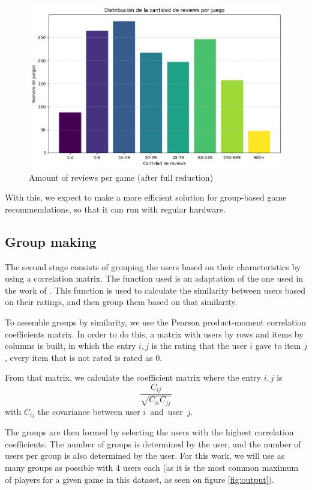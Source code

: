 \documentclass{article}
\begin{document}
\begin{figure}[h]
    \centering
    \includegraphics[width=0.9\linewidth]{ReviewsPorJuegoFinal.png}
    \caption{Amount of reviews per game (after full reduction)}
    \label{fig:reviewsPorJuegoFinal}
\end{figure}

With this, we expect to make a more efficient solution for group-based game recommendations, so that it can run with regular hardware.

\subsection{Group making}

The second stage consists of grouping the users based on their characteristics by using a correlation matrix. The function used is an adaptation of the one used in the work of \cite{group_recommenders_repo}. This function is used to calculate the similarity between users based on their ratings, and then group them based on that similarity.

To assemble groups by similarity, we use the Pearson product-moment correlation coefficients matrix. In order to do this, a matrix with users by rows and items by columns is built, in which the entry $i,j$ is the rating that the user $i$ gave to item $j$, every item that is not rated is rated as 0.

From that matrix, we calculate the coefficient matrix where the entry $i,j$ is $$\frac{C_{ij}}{\sqrt{C_{ii}C_{jj}}}$$ with $C_{ij}$  the covariance between user $i$ and user $j$.

The groups are then formed by selecting the users with the highest correlation coefficients. The number of groups is determined by the user, and the number of users per group is also determined by the user. For this work, we will use as many groups as possible with 4 users each (as it is the most common maximum of players for a given game in this dataset, as seen on figure \ref{fig:output}).
\end{document}
